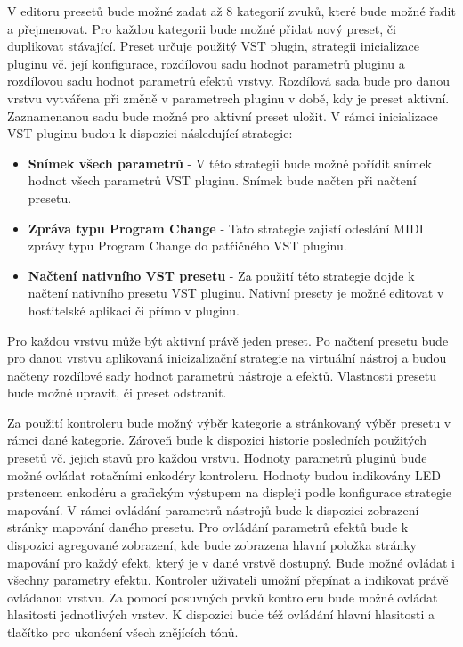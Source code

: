 \documentclass[thesis=M,czech]{FITthesis}[2019/03/06]
\begin{document}
	V editoru presetů bude možné zadat až 8 kategorií zvuků, které bude možné řadit a přejmenovat.
	Pro každou kategorii bude možné přidat nový preset, či duplikovat stávající. Preset určuje použitý VST plugin,
	strategii inicializace pluginu vč. její konfigurace, rozdílovou sadu hodnot parametrů pluginu a rozdílovou sadu hodnot parametrů efektů vrstvy.
	Rozdílová sada bude pro danou vrstvu vytvářena při změně v parametrech pluginu v době, kdy je preset aktivní. Zaznamenanou sadu bude možné pro aktivní preset uložit.
	V rámci inicializace VST pluginu budou k dispozici následující strategie:
	\begin{itemize}
		\item \textbf{Snímek všech parametrů} - V této strategii bude možné pořídit snímek hodnot všech parametrů VST pluginu. Snímek bude načten při načtení presetu.
		\item \textbf{Zpráva typu Program Change} - Tato strategie zajistí odeslání MIDI zprávy typu Program Change do patřičného VST pluginu.
		\item \textbf{Načtení nativního VST presetu} - Za použití této strategie dojde k načtení nativního presetu VST pluginu. Nativní presety je možné editovat
		v hostitelské aplikaci či přímo v pluginu.
	\end{itemize}
	Pro každou vrstvu může být aktivní právě jeden preset. Po načtení presetu bude 
	pro danou vrstvu aplikovaná inicizalizační strategie na virtuální nástroj a budou načteny rozdílové sady hodnot parametrů nástroje a efektů.
	Vlastnosti presetu bude možné upravit, či preset odstranit.
	
	Za použití kontroleru bude možný výběr kategorie a stránkovaný výběr presetu v rámci dané kategorie. Zároveň bude k dispozici
	historie posledních použitých presetů vč. jejich stavů pro každou vrstvu.
	Hodnoty parametrů pluginů bude možné ovládat rotačními enkodéry kontroleru. Hodnoty budou indikovány LED prstencem enkodéru a grafickým výstupem na displeji podle konfigurace strategie mapování.
	V rámci ovládání parametrů nástrojů bude k dispozici
	zobrazení stránky mapování daného presetu. Pro ovládání parametrů efektů bude k dispozici agregované zobrazení, kde bude zobrazena
	hlavní položka stránky mapování pro každý efekt, který je v dané vrstvě dostupný. Bude možné ovládat i všechny parametry efektu.
	Kontroler uživateli umožní přepínat a indikovat právě ovládanou vrstvu. 
	Za pomocí posuvných prvků kontroleru bude možné ovládat hlasitosti jednotlivých vrstev.
	K dispozici bude též ovládání hlavní hlasitosti a tlačítko pro ukonćení všech znějících tónů.
	
\end{document}
